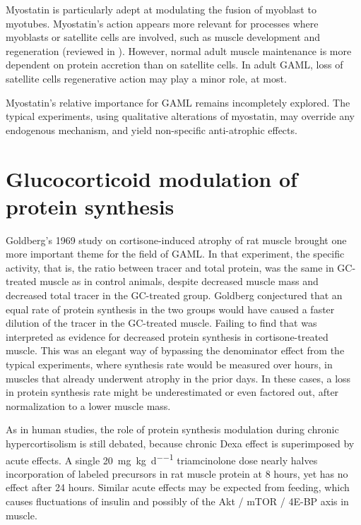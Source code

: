 \documentclass[12pt,english]{report}\usepackage[]{graphicx}\usepackage[]{color}
\begin{document}
Myostatin is particularly adept at modulating the fusion of myoblast
to myotubes\citep{nozaki2008improved}. Myostatin's action appears
more relevant for processes where myoblasts or satellite cells are
involved, such as muscle development and regeneration (reviewed in
\citep{carnac2007myostatin,elliott2012central}). However, normal
adult muscle maintenance is more dependent on protein accretion than
on satellite cells. In adult GAML, loss of satellite cells regenerative
action may play a minor role, at most.

Myostatin's relative importance for GAML remains incompletely explored.
The typical experiments, using qualitative alterations of myostatin,
may override any endogenous mechanism, and yield non-specific anti-atrophic
effects.


\section{Glucocorticoid modulation of protein synthesis}

Goldberg's\citep{goldberg1969protein} 1969 study on cortisone-induced
atrophy of rat muscle brought one more important theme for the field
of GAML. In that experiment, the specific activity, that is, the ratio
between tracer and total protein, was the same in GC-treated muscle
as in control animals, despite decreased muscle mass and decreased
total tracer in the GC-treated group. Goldberg conjectured that an
equal rate of protein synthesis in the two groups would have caused
a faster dilution of the tracer in the GC-treated muscle. Failing
to find that was interpreted as evidence for decreased protein synthesis
in cortisone-treated muscle. This was an elegant way of bypassing
the denominator effect from the typical experiments, where synthesis
rate would be measured over hours, in muscles that already underwent
atrophy in the prior days. In these cases, a loss in protein synthesis
rate might be underestimated or even factored out, after normalization
to a lower muscle mass.

As in human studies, the role of protein synthesis modulation during
chronic hypercortisolism is still debated, because chronic Dexa effect
is superimposed by acute effects. A single \SI{20}{\milli\gram\per\kilo\gram\per\day}
triamcinolone dose nearly halves incorporation of labeled precursors
in rat muscle protein at 8 hours, yet has no effect after 24 hours\citep{peters1970biochemical}.
Similar acute effects may be expected from feeding, which causes fluctuations
of insulin and possibly of the Akt / mTOR / 4E-BP axis in muscle.
\end{document}
